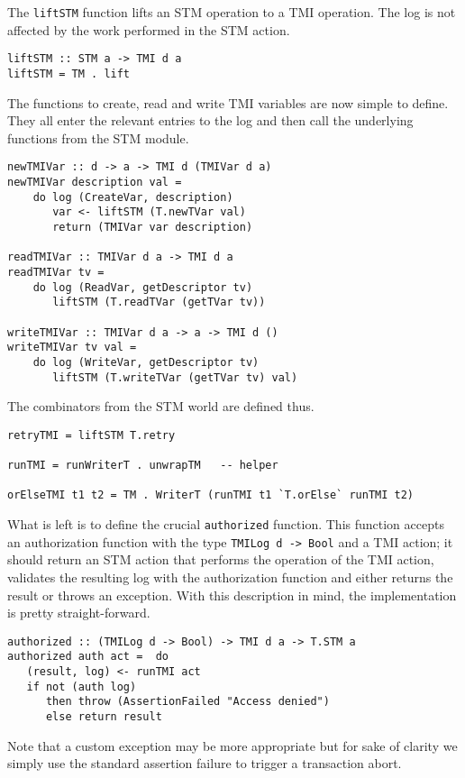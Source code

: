 The \lstinline+liftSTM+ function lifts an STM operation to a TMI operation. The log
is not affected by the work performed in the STM action.
\begin{lstlisting}[style=small]
liftSTM :: STM a -> TMI d a
liftSTM = TM . lift
\end{lstlisting}

The functions to create, read and write TMI variables are now simple to define. They
all enter the relevant entries to the log and then call the underlying functions
from the STM module.
\begin{lstlisting}[style=small]
newTMIVar :: d -> a -> TMI d (TMIVar d a)
newTMIVar description val =
    do log (CreateVar, description)
       var <- liftSTM (T.newTVar val)
       return (TMIVar var description)

readTMIVar :: TMIVar d a -> TMI d a
readTMIVar tv = 
    do log (ReadVar, getDescriptor tv)
       liftSTM (T.readTVar (getTVar tv))

writeTMIVar :: TMIVar d a -> a -> TMI d ()
writeTMIVar tv val = 
    do log (WriteVar, getDescriptor tv)
       liftSTM (T.writeTVar (getTVar tv) val)
\end{lstlisting}

The combinators from the STM world are defined thus.
\begin{lstlisting}[style=small]
retryTMI = liftSTM T.retry

runTMI = runWriterT . unwrapTM   -- helper

orElseTMI t1 t2 = TM . WriterT (runTMI t1 `T.orElse` runTMI t2)
\end{lstlisting}

What is left is to define the crucial \lstinline+authorized+ function. This function
accepts an authorization function with the type \lstinline+TMILog d -> Bool+
and a TMI action; it should return an STM action that performs the operation
of the TMI action, validates the resulting log with the authorization function and
either returns the result or throws an exception. With this description in mind,
the implementation is pretty straight-forward.
\begin{lstlisting}[style=small]
authorized :: (TMILog d -> Bool) -> TMI d a -> T.STM a
authorized auth act =  do
   (result, log) <- runTMI act
   if not (auth log)
      then throw (AssertionFailed "Access denied")
      else return result
\end{lstlisting}
Note that a custom exception may be more appropriate but for sake of clarity
we simply use the standard assertion failure to trigger a transaction abort.

